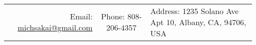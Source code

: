 \documentclass[11pt]{article} %
\begin{document}
\setlength{\parskip}{\baselineskip}%



\begin{center}
	\\%
	\noindent\begin{tabular}{r @{$\quad\bullet\quad$} c @{$\quad\bullet\quad$} l}
		\small{Email: \href{mailto:michsakai@gmail.com}{michsakai@gmail.com}} & \small{Phone: 808-206-4357} & \small{Address: 1235 Solano Ave Apt 10, Albany, CA, 94706, USA}
	\end{tabular}
\end{center}

%


%
\end{document}
